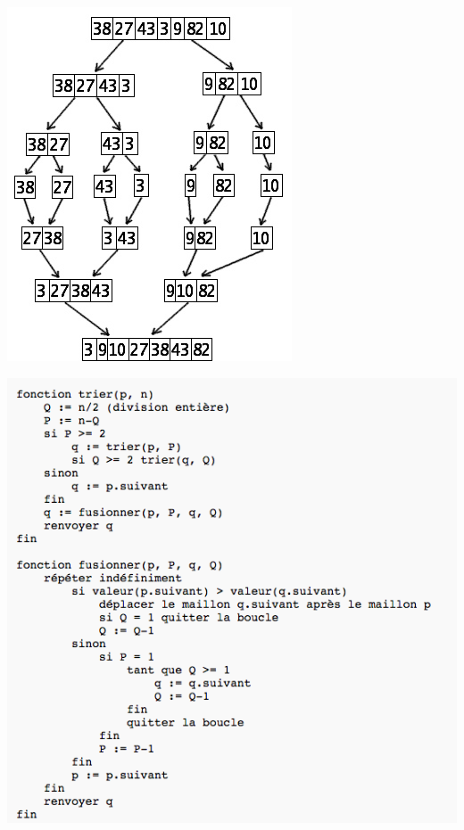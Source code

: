 \documentclass[french]{beamer}%
\begin{document}
			\begin{frame}
				\begin{center}
					\includegraphics[scale=0.4]{TFS}
				\end{center}
			\end{frame}
		
			\begin{frame}
				\begin{center}
					\includegraphics[scale=0.35]{TFC}
				\end{center}
			\end{frame}
	
\end{document}
